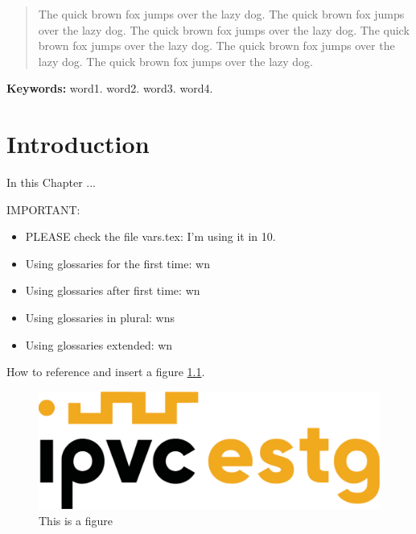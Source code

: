 \documentclass[11pt,a4paper]{report}
\begin{document}


\begin{abstract}




The quick brown fox jumps over the lazy dog. The quick brown fox jumps over the lazy dog. The quick brown fox jumps over the lazy dog. The quick brown fox jumps over the lazy dog. The quick brown fox jumps over the lazy dog. The quick brown fox jumps over the lazy dog. 
 
\end{abstract}


\textbf{Keywords:} word1. word2. word3. word4.

\tableofcontents
\glsaddall
\printglossary[type=\acronymtype]
\printglossary[type=main,title={Glossary},toctitle={Glossary}]

\chapter{Introduction}
\label{chap:introduction}

In this Chapter ... 

IMPORTANT:
\begin{itemize}
    \item PLEASE check the file vars.tex: I'm using it in 10\kbps.
    \item Using glossaries for the first time: \gls{wn}
    \item Using glossaries after first time: \gls{wn}
    \item Using glossaries in plural: \glspl{wn}
    \item Using glossaries extended: \glsdesc{wn}
\end{itemize}

How to reference and insert a figure \ref{fig:labeloffigure}. 

\begin{figure}[ht]
    \centering
    \includegraphics[scale=0.7]{figs/ESTG_logo.png}
    \caption{This is a figure}
    \label{fig:labeloffigure}
\end{figure}
\end{document}
